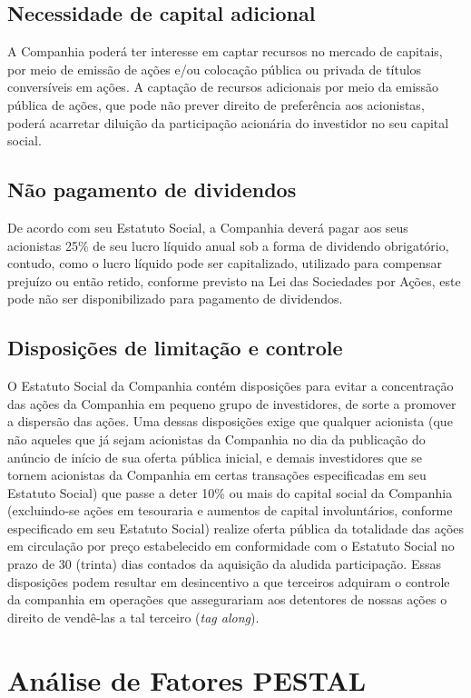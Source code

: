 {{{\subsection{Necessidade de capital adicional}
A Companhia poderá ter interesse em captar recursos no mercado de capitais, por meio de emissão de ações e/ou colocação pública ou privada de títulos conversíveis em ações. A captação de recursos adicionais por meio da emissão pública de ações, que pode não prever direito de preferência aos acionistas, poderá acarretar diluição da participação acionária do investidor no seu capital social.

\subsection{Não pagamento de dividendos}
De acordo com seu Estatuto Social, a Companhia deverá pagar aos seus acionistas 25\% de seu lucro líquido anual sob a forma de dividendo obrigatório, contudo, como o lucro líquido pode ser capitalizado, utilizado para compensar prejuízo ou então retido, conforme previsto na Lei das Sociedades por Ações, este pode não ser disponibilizado para pagamento de dividendos.

\subsection{Disposições de limitação e controle}
O Estatuto Social da Companhia contém disposições para evitar a concentração das ações da Companhia em pequeno grupo de investidores, de sorte a promover a dispersão das ações. Uma dessas disposições exige que qualquer acionista (que não aqueles que já sejam acionistas da Companhia no dia da publicação do anúncio de início de sua oferta pública inicial, e demais investidores que se tornem acionistas da Companhia em certas transações especificadas em seu Estatuto Social) que passe a deter 10\% ou mais do capital social da Companhia (excluindo-se ações em tesouraria e aumentos de capital involuntários, conforme especificado em seu Estatuto Social) realize oferta pública da totalidade das ações em circulação por preço estabelecido em conformidade com o Estatuto Social no prazo de 30 (trinta) dias contados da aquisição da aludida participação. Essas disposições podem resultar em desincentivo a que terceiros adquiram o controle da companhia em operações que assegurariam aos detentores de nossas ações o direito de vendê-las a tal terceiro (\emph{tag along}).

\section{Análise de Fatores PESTAL}

}}}

